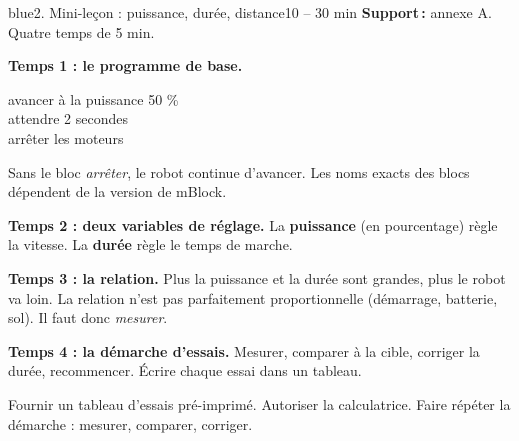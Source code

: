 \documentclass[11pt,a4paper]{article}
\begin{document}
\begin{etape}{blue}{2. Mini-leçon : puissance, durée, distance}{10 -- 30 min}
\textbf{Support\,:} annexe A. Quatre temps de 5 min.

\textbf{Temps 1 : le programme de base.}
\begin{code}
avancer à la puissance 50 \%\\
attendre 2 secondes\\
arrêter les moteurs
\end{code}
Sans le bloc \emph{arrêter}, le robot continue d'avancer. Les noms exacts des blocs dépendent de la version de mBlock.

\textbf{Temps 2 : deux variables de réglage.} La \textbf{puissance} (en pourcentage) règle la vitesse. La \textbf{durée} règle le temps de marche.

\textbf{Temps 3 : la relation.} Plus la puissance et la durée sont grandes, plus le robot va loin. La relation n'est pas parfaitement proportionnelle (démarrage, batterie, sol). Il faut donc \emph{mesurer}.

\begin{center}
\end{center}

\textbf{Temps 4 : la démarche d'essais.} Mesurer, comparer à la cible, corriger la durée, recommencer. Écrire chaque essai dans un tableau.

\begin{astuce}
Fournir un tableau d'essais pré-imprimé. Autoriser la calculatrice. Faire répéter la démarche : mesurer, comparer, corriger.
\end{astuce}
\end{etape}
\end{document}
